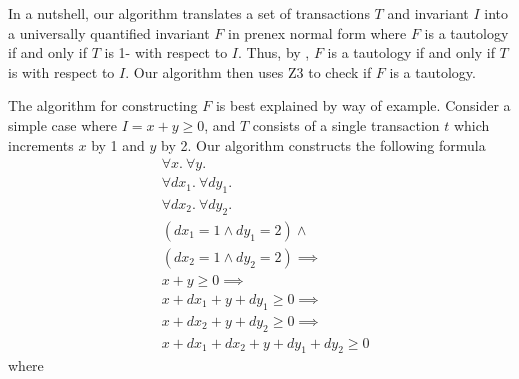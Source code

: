 In a nutshell, our algorithm translates a set of transactions $T$ and invariant
$I$ into a universally quantified invariant $F$ in prenex normal form where $F$
is a tautology if and only if $T$ is 1-\iconfluent{} with respect to $I$. Thus,
by , $F$ is a tautology if and only if $T$ is
\iconfluent{} with respect to $I$. Our algorithm then uses Z3 \cite{de2008z3}
to check if $F$ is a tautology.

The algorithm for constructing $F$ is best explained by way of example.
Consider a simple case where $I = x + y \geq 0$, and $T$ consists of a single
transaction $t$ which increments $x$ by 1 and $y$ by 2. Our algorithm
constructs the following formula
\begin{align}
  & \forall x.\> \forall y.\>                \label{eq:vars} \\
  & \forall dx_1.\> \forall dy_1.\>          \label{eq:dvars1} \\
  & \forall dx_2.\> \forall dy_2.\>          \label{eq:dvars2} \\
  & (dx_1 = 1 \land dy_1 = 2) \land {}       \label{eq:t1} \\
  & (dx_2 = 1 \land dy_2 = 2) \implies {}    \label{eq:t2} \\
  & x + y \geq 0 \implies {}                 \label{eq:i} \\
  & x + dx_1 + y + dy_1 \geq 0 \implies {}   \label{eq:i1} \\
  & x + dx_2 + y + dy_2 \geq 0 \implies {}   \label{eq:i2} \\
  & x + dx_1 + dx_2 + y + dy_1 + dy_2 \geq 0 \label{eq:i12}
\end{align}
where

